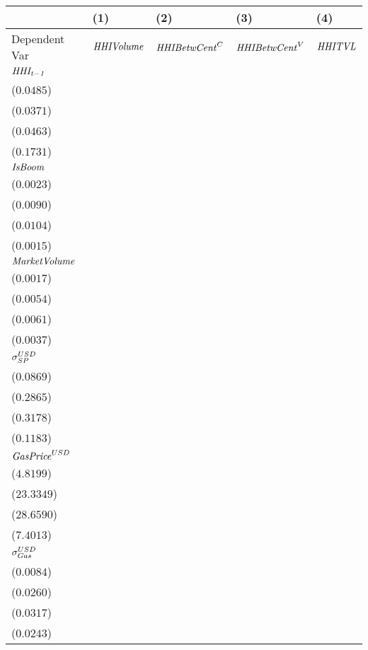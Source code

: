 \begin{tabular}{lllll}
\toprule
{} &                                       (1) &                                        (2) &                                       (3) &                                     (4) \\
\midrule
Dependent Var               &                         ${\it HHIVolume}$ &                      ${\it HHIBetwCent}^C$ &                     ${\it HHIBetwCent}^V$ &                          ${\it HHITVL}$ \\
$\it HHI_{t-1}$             &   \makecell{$0.4466^{***}$ \\ ($0.0485$)} &    \makecell{$0.6562^{***}$ \\ ($0.0371$)} &   \makecell{$0.6605^{***}$ \\ ($0.0463$)} &  \makecell{$0.3992^{**}$ \\ ($0.1731$)} \\
${\it IsBoom}$              &      \makecell{$0.0034^{}$ \\ ($0.0023$)} &    \makecell{$0.0311^{***}$ \\ ($0.0090$)} &   \makecell{$0.0396^{***}$ \\ ($0.0104$)} &  \makecell{$0.0039^{**}$ \\ ($0.0015$)} \\
${\it MarketVolume}$        &      \makecell{$0.0023^{}$ \\ ($0.0017$)} &       \makecell{$0.0036^{}$ \\ ($0.0054$)} &     \makecell{$-0.0030^{}$ \\ ($0.0061$)} &   \makecell{$-0.0043^{}$ \\ ($0.0037$)} \\
${\it \sigma}^{USD}_{SP}$   &      \makecell{$0.0367^{}$ \\ ($0.0869$)} &       \makecell{$0.4625^{}$ \\ ($0.2865$)} &     \makecell{$-0.4806^{}$ \\ ($0.3178$)} &  \makecell{$-0.2154^{*}$ \\ ($0.1183$)} \\
${\it GasPrice}^{USD}$      &  \makecell{$-11.1290^{**}$ \\ ($4.8199$)} &  \makecell{$69.8927^{***}$ \\ ($23.3349$)} &  \makecell{$71.3461^{**}$ \\ ($28.6590$)} &   \makecell{$-9.1305^{}$ \\ ($7.4013$)} \\
${\it \sigma}_{Gas}^{USD}$  &    \makecell{$-0.0162^{*}$ \\ ($0.0084$)} &     \makecell{$0.0652^{**}$ \\ ($0.0260$)} &    \makecell{$0.0740^{**}$ \\ ($0.0317$)} &    \makecell{$0.0096^{}$ \\ ($0.0243$)} \\

\end{tabular}
